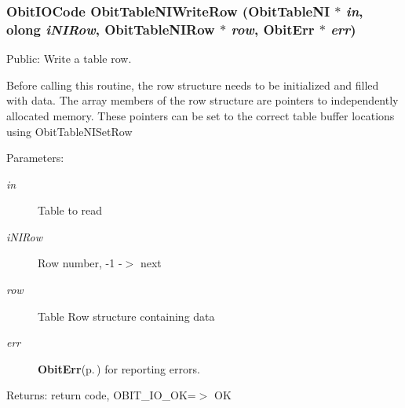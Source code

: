 \subsubsection{\setlength{\rightskip}{0pt plus 5cm}Obit\-IOCode Obit\-Table\-NIWrite\-Row ({\bf Obit\-Table\-NI} $\ast$ {\em in}, {\bf olong} {\em i\-NIRow}, {\bf Obit\-Table\-NIRow} $\ast$ {\em row}, {\bf Obit\-Err} $\ast$ {\em err})}\label{ObitTableNI_8c_a24}


Public: Write a table row. 

Before calling this routine, the row structure needs to be initialized and filled with data. The array members of the row structure are pointers to independently allocated memory. These pointers can be set to the correct table buffer locations using Obit\-Table\-NISet\-Row \begin{Desc}
\item[Parameters:]
\begin{description}
\item[{\em in}]Table to read \item[{\em i\-NIRow}]Row number, -1 -$>$ next \item[{\em row}]Table Row structure containing data \item[{\em err}]{\bf Obit\-Err}{\rm (p.\,\pageref{structObitErr})} for reporting errors. \end{description}
\end{Desc}
\begin{Desc}
\item[Returns:]return code, OBIT\_\-IO\_\-OK=$>$ OK \end{Desc}
